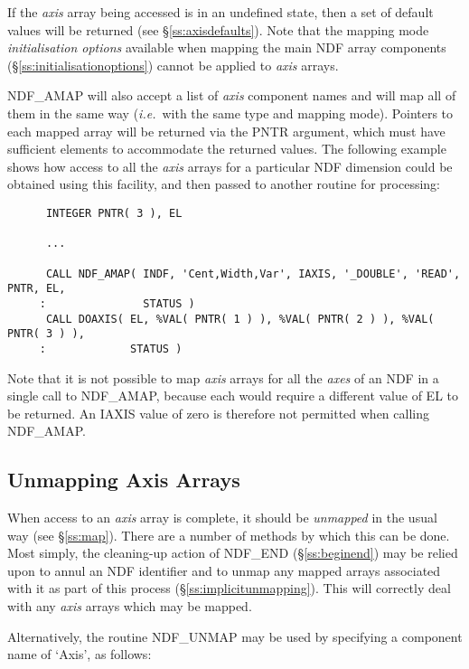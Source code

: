 \documentclass[twoside,11pt]{article}
\newcommand{\htmlref}[2]{#1}
\newcommand{\xlabel}[1]{}
\newcommand{\st}[1]{{\em{#1}}}
\begin{document}
If the \st{axis\/} array being accessed is in an undefined state, then a
set of default values will be returned (see \S\ref{ss:axisdefaults}).
Note that the mapping mode \st{initialisation options\/} available when
mapping the main NDF array components (\S\ref{ss:initialisationoptions})
cannot be applied to \st{axis\/} arrays. 

NDF\_AMAP will also accept a list of \st{axis\/} component names and will
map all of them in the same way (\st{i.e.}\ with the same type and mapping
mode). 
Pointers to each mapped array will be returned via the PNTR argument, which
must have sufficient elements to accommodate the returned values. 
The following example shows how access to all the \st{axis\/} arrays for a
particular NDF dimension could be obtained using this facility, and then
passed to another routine for processing: 

\small
\begin{verbatim}
      INTEGER PNTR( 3 ), EL

      ...

      CALL NDF_AMAP( INDF, 'Cent,Width,Var', IAXIS, '_DOUBLE', 'READ', PNTR, EL,
     :               STATUS )
      CALL DOAXIS( EL, %VAL( PNTR( 1 ) ), %VAL( PNTR( 2 ) ), %VAL( PNTR( 3 ) ),
     :             STATUS )
\end{verbatim}
\normalsize

Note that it is not possible to map \st{axis\/} arrays for all the
\st{axes\/} of an NDF in a single call to NDF\_AMAP, because each
would require 
a different value of EL to be returned. 
An IAXIS value of zero is therefore not permitted when calling NDF\_AMAP. 

\subsection{\xlabel{unmapping_axis_arrays}Unmapping Axis Arrays}

When access to an \st{axis\/} array is complete, it should be
\st{unmapped\/} in the usual way (see \S\ref{ss:map}). There are a
number 
of methods by which this can be done.
Most simply, the cleaning-up action of \htmlref{NDF\_END}{NDF_END} (\S\ref{ss:beginend}) may be
relied upon to annul an NDF identifier and to unmap any mapped arrays
associated with it as part of this process (\S\ref{ss:implicitunmapping}). 
This will correctly deal with any \st{axis\/} arrays which may be mapped. 

Alternatively, the routine \htmlref{NDF\_UNMAP}{NDF_UNMAP} may be used by specifying a component
name of `Axis', as follows: 
\end{document}
